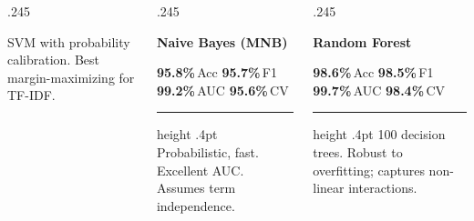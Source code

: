 \documentclass[aspectratio=169,10pt]{beamer}
\begin{document}
\begin{frame}[t]
\begin{columns}[T]
\begin{column}{.245\textwidth}
\begin{tcolorbox}[mycard={APurple}{APurple},top=0pt,left=0pt,right=0pt,bottom=3pt]
    {\tiny\color{Slate}SVM with probability calibration. Best margin-maximizing for TF-IDF.}
  \end{tcolorbox}
\end{column}
\begin{column}{.245\textwidth}
  \begin{tcolorbox}[mycard={AOrange}{AOrange},top=0pt,left=0pt,right=0pt,bottom=3pt]
    \begin{tcolorbox}[statbox={AOrange},arc=0pt,top=3pt,bottom=3pt]
      {\scriptsize\bfseries\color{white}Naive Bayes (MNB)}
    \end{tcolorbox}
    \vspace{2pt}\centering
    {\footnotesize\bfseries\color{AOrange}95.8\%}\,{\tiny\color{Slate}Acc}\quad
    {\footnotesize\bfseries\color{AOrange}95.7\%}\,{\tiny\color{Slate}F1}\\[1pt]
    {\footnotesize\bfseries\color{AOrange}99.2\%}\,{\tiny\color{Slate}AUC}\quad
    {\footnotesize\bfseries\color{AOrange}95.6\%}\,{\tiny\color{Slate}CV}\\
    \vspace{3pt}\hrule height .4pt\vspace{3pt}
    {\tiny\color{Slate}Probabilistic, fast. Excellent AUC. Assumes term independence.}
  \end{tcolorbox}
\end{column}
\begin{column}{.245\textwidth}
  \begin{tcolorbox}[mycard={AGreen}{AGreen},top=0pt,left=0pt,right=0pt,bottom=3pt]
    \begin{tcolorbox}[statbox={AGreen},arc=0pt,top=3pt,bottom=3pt]
      {\scriptsize\bfseries\color{white}Random Forest}
    \end{tcolorbox}
    \vspace{2pt}\centering
    {\footnotesize\bfseries\color{AGreen}98.6\%}\,{\tiny\color{Slate}Acc}\quad
    {\footnotesize\bfseries\color{AGreen}98.5\%}\,{\tiny\color{Slate}F1}\\[1pt]
    {\footnotesize\bfseries\color{AGreen}99.7\%}\,{\tiny\color{Slate}AUC}\quad
    {\footnotesize\bfseries\color{AGreen}98.4\%}\,{\tiny\color{Slate}CV}\\
    \vspace{3pt}\hrule height .4pt\vspace{3pt}
    {\tiny\color{Slate}100 decision trees. Robust to overfitting; captures non-linear interactions.}
  \end{tcolorbox}
\end{column}

\end{columns}
\end{frame}
\end{document}
